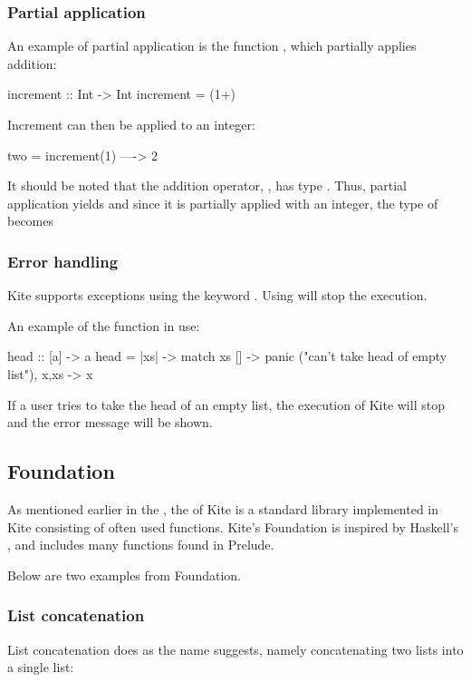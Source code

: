 \subsubsection{Partial application}
An example of partial application is the function , which partially applies addition:

\begin{kite}
increment :: Int -> Int
increment = (1+)
\end{kite}

Increment can then be applied to an integer:

\begin{kite}
two = increment(1) ----> 2
\end{kite}

It should be noted that the addition operator, \code{+}, has type . Thus, partial application yields  and since
it is partially applied with an integer, the type of 
becomes 

\subsubsection{Error handling}
Kite supports exceptions using the keyword . Using  will stop the execution.

An example of the  function in use:
\begin{kite}
  head :: [a] -> a
  head = |xs| -> {
    match xs {
      [] -> panic ("can't take head of empty list"),
      x,xs -> x
    }
  }
\end{kite}
If a user tries to take the head of an empty list, the execution of Kite will stop and the error message will be shown.


\subsection{Foundation}
As mentioned earlier in the , the  of Kite is a standard library implemented in Kite consisting of often used functions. Kite's Foundation is inspired by Haskell's , and includes many functions found in
Prelude. 

Below are two examples from Foundation.
\subsubsection{List concatenation}
List concatenation does as the name suggests, namely concatenating two lists into a single list:

